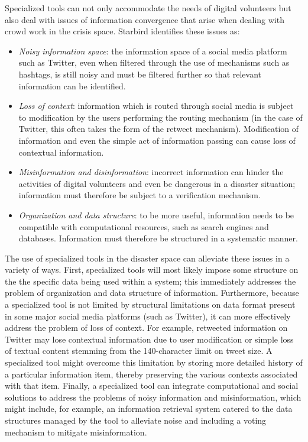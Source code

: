 Specialized tools can not only accommodate the needs of digital volunteers but also deal with issues of information convergence that arise when dealing with crowd work in the crisis space.  Starbird identifies these issues \cite{starbird:doctoral} as:

\begin{itemize}
  \item{} {\em Noisy information space}: the information space of a social media platform such as Twitter, even when filtered through the use of mechanisms such as hashtags, is still noisy and must be filtered further so that relevant information can be identified.
  \item{} {\em Loss of context}: information which is routed through social media is subject to modification by the users performing the routing mechanism (in the case of Twitter, this often takes the form of the retweet mechanism).  Modification of information and even the simple act of information passing can cause loss of contextual information.
  \item{} {\em Misinformation and disinformation}: incorrect information can hinder the activities of digital volunteers and even be dangerous in a disaster situation; information must therefore be subject to a verification mechanism.
  \item{} {\em Organization and data structure}: to be more useful, information needs to be compatible with computational resources, such as search engines and databases.  Information must therefore be structured in a systematic manner.
\end{itemize}

The use of specialized tools in the disaster space can alleviate these issues in a variety of ways.  First, specialized tools will most likely impose some structure on the the specific data being used within a system; this immediately addresses the problem of organization and data structure of information.  Furthermore, because a specialized tool is not limited by structural limitations on data format present in some major social media platforms (such as Twitter), it can more effectively address the problem of loss of context.  For example, retweeted information on Twitter may lose contextual information due to user modification or simple loss of textual content stemming from the 140-character limit on tweet size.  A specialized tool might overcome this limitation by storing more detailed history of a particular information item, thereby preserving the various contexts associated with that item.  Finally, a specialized tool can integrate computational and social solutions to address the problems of noisy information and misinformation, which might include, for example, an information retrieval system catered to the data structures managed by the tool to alleviate noise and including a voting mechanism to mitigate misinformation.


